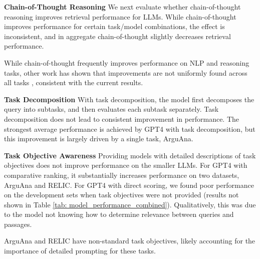 \documentclass[11pt]{article}
\begin{document}
\textbf{Chain-of-Thought Reasoning}
We next evaluate whether chain-of-thought reasoning improves retrieval performance for LLMs. While chain-of-thought improves performance for certain task/model combinations, the effect is inconsistent, and in aggregate chain-of-thought slightly decreases retrieval performance. 

While chain-of-thought frequently improves performance on NLP and reasoning tasks, other work has shown that improvements are not uniformly found across all tasks \citep{Big_Bench_hard}, consistent with the current results. 

\textbf{Task Decomposition}
With task decomposition, the model first decomposes the query into subtasks, and then evaluates each subtask separately. Task decomposition does not lead to consistent improvement in performance. The strongest average performance is achieved by GPT4 with task decomposition, but this improvement is largely driven by a single task, ArguAna.

\textbf{Task Objective Awareness}
Providing models with detailed descriptions of task objectives does not improve performance on the smaller LLMs. For GPT4 with comparative ranking, it substantially increases performance on two datasets, ArguAna and RELIC. For GPT4 with direct scoring, we found poor performance on the development sets when task objectives were not provided (results not shown in Table \ref{tab: model_performance_combined}).
Qualitatively, this was due to the model not knowing how to determine relevance between queries and passages. 

ArguAna and RELIC have non-standard task objectives, likely accounting for the importance of detailed prompting for these tasks.
\end{document}
